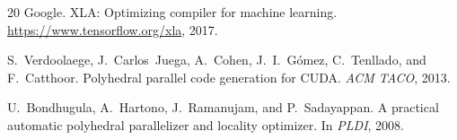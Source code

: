 \documentclass[11pt,a4paper]{article}
\begin{document}
\begin{thebibliography}{20}
Google.
\newblock XLA: Optimizing compiler for machine learning.
\newblock \url{https://www.tensorflow.org/xla}, 2017.

S.~Verdoolaege, J.~Carlos~Juega, A.~Cohen, J.~I.~G\'{o}mez, C.~Tenllado, and F.~Catthoor.
\newblock Polyhedral parallel code generation for CUDA.
\newblock \emph{ACM TACO}, 2013.

U.~Bondhugula, A.~Hartono, J.~Ramanujam, and P.~Sadayappan.
\newblock A practical automatic polyhedral parallelizer and locality optimizer.
\newblock In \emph{PLDI}, 2008.

\end{thebibliography}
\end{document}
